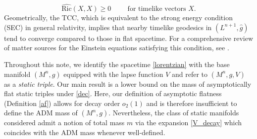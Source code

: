 \documentclass[12pt]{amsart}
\theoremstyle{definition}
\numberwithin{equation}{section}
\begin{document}
\begin{equation} \label{dec}
  \widehat{\text{Ric}} (X,X) \geq 0 \hspace{1cm} \text{for timelike vectors    } X.
\end{equation}
Geometrically, the TCC, which is equivalent to the strong energy condition (SEC) in general relativity, implies that nearby timelike geodesics in $(L^{n+1},\widehat{g})$ tend to converge compared to those in flat spacetime. For a comprehensive review of matter sources for the Einstein equations satisfying this condition, see \cite{EC16}.

Throughout this note, we identify the spacetime \eqref{lorentzian} with the base manifold $(M^{n},g)$ equipped with the lapse function $V$ and refer to $(M^{n},g,V)$ as a \textit{static triple}. Our main result is a lower bound on the mass of asymptotically flat static triples under \eqref{dec}. Here, our definition of asymptotic flatness (Definition \ref{af}) allows for decay order $o_{2}(1)$ and is therefore insufficient to define the ADM mass of $(M^{n},g)$. Nevertheless, the class of static manifolds considered admit a notion of total mass $m$ via the expansion \eqref{V_decay} which coincides with the ADM mass whenever well-defined. 
\end{document}
